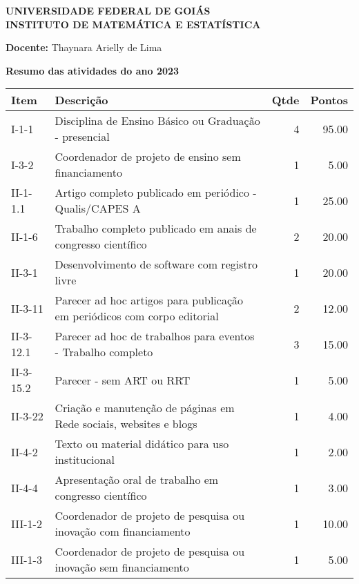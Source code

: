 \documentclass[11pt,a4paper]{article}
\begin{document}
\thispagestyle{empty}

\begin{center}
  \textbf{UNIVERSIDADE FEDERAL DE GOIÁS\\
  INSTITUTO DE MATEMÁTICA E ESTATÍSTICA}
\end{center}

\noindent\textbf{Docente:}
Thaynara Arielly de Lima

\begin{center}
\large \textbf{
Resumo das atividades do ano 2023
}
\end{center}
\vspace{-0.5cm}
\begin{table}[ht]
\centering
\begin{tabular}{|l|p{12cm}|r|r|}
  \hline
{\textbf{Item}} & {\textbf{Descrição}} & {\textbf{Qtde}} & {\textbf{Pontos}} \\ 
  \hline
I-1-1 & Disciplina de Ensino Básico ou Graduação - presencial &   4 & 95.00 \\ 
  I-3-2 & Coordenador de projeto de ensino sem financiamento &   1 & 5.00 \\ 
  II-1-1.1 & Artigo completo publicado em periódico - Qualis/CAPES A &   1 & 25.00 \\ 
  II-1-6 & Trabalho completo publicado em anais de congresso científico &   2 & 20.00 \\ 
  II-3-1 & Desenvolvimento de software com registro livre &   1 & 20.00 \\ 
  II-3-11 & Parecer ad hoc artigos para publicação em periódicos com corpo editorial &   2 & 12.00 \\ 
  II-3-12.1 & Parecer ad hoc de trabalhos para eventos - Trabalho completo &   3 & 15.00 \\ 
  II-3-15.2 & Parecer - sem ART ou RRT &   1 & 5.00 \\ 
  II-3-22 & Criação e manutenção de páginas em Rede sociais, websites e blogs &   1 & 4.00 \\ 
  II-4-2 & Texto ou material didático para uso institucional &   1 & 2.00 \\ 
  II-4-4 & Apresentação oral de trabalho em congresso científico &   1 & 3.00 \\ 
  III-1-2 & Coordenador de projeto de pesquisa ou inovação com financiamento &   1 & 10.00 \\ 
  III-1-3 & Coordenador de projeto de pesquisa ou inovação sem financiamento &   1 & 5.00 \\ 

\end{tabular}
\end{table}
\end{document}
